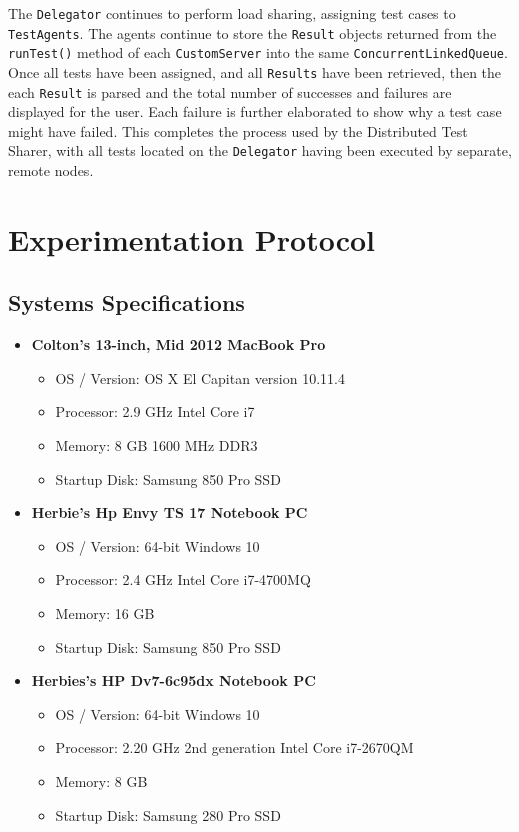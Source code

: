 \documentclass{article}
\begin{document}
{The \texttt{Delegator} continues to perform load sharing, assigning test cases to \texttt{TestAgents}.  The agents continue to store the \texttt{Result} objects returned from the \texttt{runTest()} method of each \texttt{CustomServer} into the same \texttt{ConcurrentLinkedQueue}.  Once all tests have been assigned, and all \texttt{Results} have been retrieved, then the each \texttt{Result} is parsed and the total number of successes and failures are displayed for the user.  Each failure is further elaborated to show why a test case might have failed.  This completes the process used by the Distributed Test Sharer, with all tests located on the \texttt{Delegator} having been executed by separate, remote nodes.

\section{Experimentation Protocol}
\label{experiments}

\subsection{Systems Specifications}
\label{specs}

\begin{itemize}
\item \textbf{Colton's 13-inch, Mid 2012 MacBook Pro}
\begin{itemize}
    \item OS / Version: OS X El Capitan version 10.11.4
    \item Processor: 2.9 GHz Intel Core i7
    \item Memory: 8 GB 1600 MHz DDR3
    \item Startup Disk: Samsung 850 Pro SSD
\end{itemize}

\item \textbf{Herbie's Hp Envy TS 17 Notebook PC}
\begin{itemize}
    \item OS / Version: 64-bit Windows 10
    \item Processor: 2.4 GHz Intel Core i7-4700MQ
    \item Memory: 16 GB
    \item Startup Disk: Samsung 850 Pro SSD
\end{itemize}

\item \textbf{Herbies's HP Dv7-6c95dx Notebook PC}
\begin{itemize}
    \item OS / Version: 64-bit Windows 10
    \item Processor: 2.20 GHz 2nd generation Intel Core i7-2670QM
    \item Memory: 8 GB
    \item Startup Disk: Samsung 280 Pro SSD
\end{itemize}


\end{itemize}}
\end{document}
